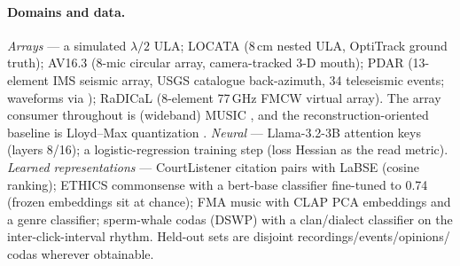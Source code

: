 \documentclass[11pt]{article}
\theoremstyle{remark}
\begin{document}
\paragraph{Domains and data.} \emph{Arrays} --- a simulated $\lambda/2$ ULA; LOCATA
\citep{evers2020locata} (8\,cm nested ULA, OptiTrack ground truth); AV16.3
\citep{lathoud2004av163} (8-mic circular array, camera-tracked 3-D mouth); PDAR (13-element
IMS seismic array, USGS catalogue back-azimuth, 34 teleseismic events; waveforms via
\citealp{iris}); RaDICaL \citep{lim2021radical} (8-element 77\,GHz FMCW virtual array).
The array consumer throughout is (wideband) MUSIC \citep{schmidt1986music}, and the
reconstruction-oriented baseline is Lloyd--Max quantization \citep{lloyd1982}. \emph{Neural}
--- Llama-3.2-3B \citep{grattafiori2024llama3} attention keys (layers 8/16); a
logistic-regression training step (loss Hessian as the read metric). \emph{Learned
representations} --- CourtListener \citep{courtlistener} citation pairs with LaBSE
\citep{feng2022labse} (cosine ranking); ETHICS commonsense \citep{hendrycks2021ethics} with
a bert-base classifier fine-tuned to 0.74 (frozen embeddings sit at chance); FMA music
\citep{defferrard2017fma} with CLAP \citep{wu2023clap} PCA embeddings and a genre
classifier; sperm-whale codas \citep{sharma2024codas} (DSWP) with a clan/dialect classifier
on the inter-click-interval rhythm. Held-out sets are disjoint recordings/events/opinions/
codas wherever obtainable.
\end{document}
